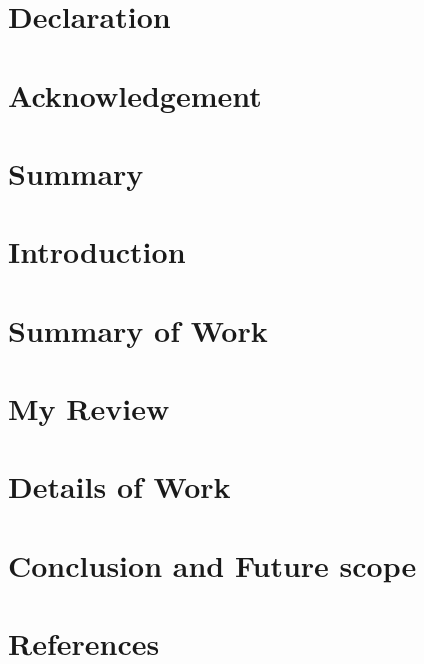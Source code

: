 \documentclass[12pt]{report}
\begin{document}






\chapter*{Declaration}


\chapter*{Acknowledgement}



\tableofcontents

\clearpage
{}

\chapter{Summary}

\chapter{Introduction}

\chapter{Summary of Work}

\chapter{My Review}

\chapter{Details of Work}

\chapter{Conclusion and Future scope}

\chapter{References}

\end{document}
